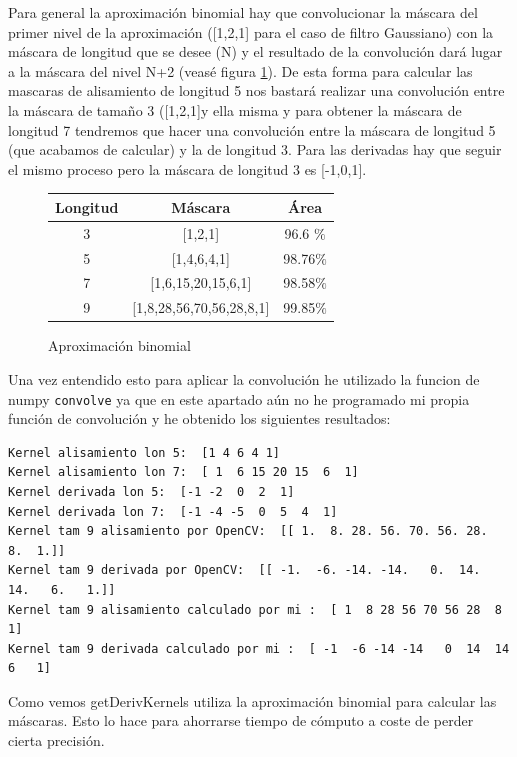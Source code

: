 \documentclass[12pt,spanish]{article}
\begin{document}
Para general la aproximación binomial hay que convolucionar la máscara del primer nivel de la aproximación ([1,2,1] para el caso de filtro Gaussiano) con la máscara de longitud que se desee (N) y el resultado de la convolución dará lugar a la máscara del nivel N+2 (veasé figura \ref{aproximacion_binomial}). De esta forma para calcular las mascaras de alisamiento de longitud 5 nos bastará realizar una convolución entre la máscara de tamaño 3 ([1,2,1]y ella misma y para obtener la máscara de longitud 7 tendremos que hacer una convolución entre la máscara de longitud 5 (que acabamos de calcular) y la de longitud 3. Para las derivadas hay que seguir el mismo proceso pero la máscara de longitud 3 es [-1,0,1].

\begin{figure}[H]
	\centering
	\begin{tabular}{|c | c | c |}
		\hline
		Longitud & Máscara & Área \\ \hline
		3 & [1,2,1] & 96.6 $\%$ \\ \hline
		5 & [1,4,6,4,1] & 98.76$\%$ \\ \hline
		7 & [1,6,15,20,15,6,1] & 98.58$\%$ \\ \hline
		9 & [1,8,28,56,70,56,28,8,1] & 99.85$\%$\\ \hline
	\end{tabular}
	\caption{Aproximación binomial}
	\label{aproximacion_binomial}
\end{figure}

Una vez entendido esto para aplicar la convolución he utilizado la funcion de numpy \texttt{convolve} ya que en este apartado aún no he programado mi propia función de convolución y he obtenido los siguientes resultados:

\begin{lstlisting}[frame=single]
Kernel alisamiento lon 5:  [1 4 6 4 1]
Kernel alisamiento lon 7:  [ 1  6 15 20 15  6  1]
Kernel derivada lon 5:  [-1 -2  0  2  1]
Kernel derivada lon 7:  [-1 -4 -5  0  5  4  1]
Kernel tam 9 alisamiento por OpenCV:  [[ 1.  8. 28. 56. 70. 56. 28.  8.  1.]]
Kernel tam 9 derivada por OpenCV:  [[ -1.  -6. -14. -14.   0.  14.  14.   6.   1.]]
Kernel tam 9 alisamiento calculado por mi :  [ 1  8 28 56 70 56 28  8  1]
Kernel tam 9 derivada calculado por mi :  [ -1  -6 -14 -14   0  14  14   6   1]
\end{lstlisting}

Como vemos getDerivKernels utiliza la aproximación binomial para calcular las máscaras. Esto lo hace para ahorrarse tiempo de cómputo a coste de perder cierta precisión.
\end{document}
